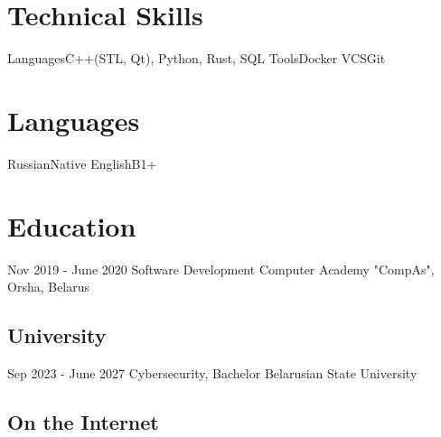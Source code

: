 \documentclass[11pt,a4paper]{moderncv}
\begin{document}
\section{Technical Skills}
\cvline
  {Languages}{C++(STL, Qt), Python, Rust, SQL}
\cvline 
  {Tools}{Docker}
\cvline
  {VCS}{Git}
\section {Languages}
\cvline 
  {Russian}{Native}
\cvline 
  {English}{B1+}
\section{Education}
  \cventry
    {Nov 2019 - June 2020}
    {Software Development}
    {Computer Academy "CompAs", Orsha, Belarus}
    {}{}{}
  \subsection{University}
  \cventry
    {Sep 2023 - June 2027}
    {Cybersecurity, Bachelor}
    {Belarusian State University}
    {}{}{}


  \subsection{On the Internet}
\end{document}
